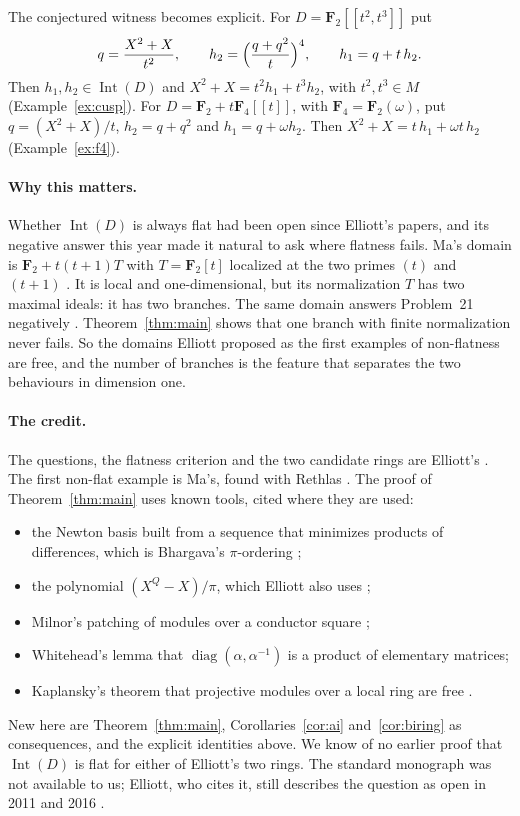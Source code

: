 \documentclass[11pt,a4paper]{article}
\theoremstyle{plain}
\theoremstyle{remark}
\newcommand{\F}{\mathbf F}
\newcommand{\Int}{\operatorname{Int}}
\begin{document}
The conjectured witness becomes explicit. For $D=\F_2[[t^2,t^3]]$ put
\[
 q=\frac{X^2+X}{t^2},\qquad h_2=\Bigl(\frac{q+q^2}{t}\Bigr)^4,\qquad h_1=q+t\,h_2 .
\]
Then $h_1,h_2\in\Int(D)$ and $X^2+X=t^2h_1+t^3h_2$, with $t^2,t^3\in M$ (Example~\ref{ex:cusp}). For
$D=\F_2+t\F_4[[t]]$, with $\F_4=\F_2(\omega)$, put $q=(X^2+X)/t$, $h_2=q+q^2$ and $h_1=q+\omega h_2$. Then
$X^2+X=t\,h_1+\omega t\,h_2$ (Example~\ref{ex:f4}).

\paragraph{Why this matters.}
Whether $\Int(D)$ is always flat had been open since Elliott's papers, and its negative answer this year
\cite{Ma} made it natural to ask where flatness fails. Ma's domain is $\F_2+t(t+1)T$ with $T=\F_2[t]$ localized at
the two primes $(t)$ and $(t+1)$ \cite[\S3]{Ma}. It is local and one-dimensional, but its normalization $T$ has two
maximal ideals: it has two branches. The same domain answers Problem~21 negatively \cite[Theorem~3.4]{JLSWXY}.
Theorem~\ref{thm:main} shows that one branch with finite normalization never fails. So the domains Elliott proposed
as the first examples of non-flatness are free, and the number of branches is the feature that separates the two
behaviours in dimension one.

\paragraph{The credit.}
The questions, the flatness criterion and the two candidate rings are Elliott's \cite{E11a,E11b,CFFG}. The first
non-flat example is Ma's, found with Rethlas \cite{Ma,Rethlas}. The proof of Theorem~\ref{thm:main} uses known tools,
cited where they are used:
\begin{itemize}
\item the Newton basis built from a sequence that minimizes products of differences, which is Bhargava's
$\pi$-ordering \cite{Bha};
\item the polynomial $(X^Q-X)/\pi$, which Elliott also uses \cite[Proposition~5.4, p.~16]{E11b};
\item Milnor's patching of modules over a conductor square \cite[\S2]{Mil};
\item Whitehead's lemma that $\operatorname{diag}(\alpha,\alpha^{-1})$ is a product of elementary matrices;
\item Kaplansky's theorem that projective modules over a local ring are free \cite{Kap}.
\end{itemize}
New here are Theorem~\ref{thm:main}, Corollaries~\ref{cor:ai} and~\ref{cor:biring} as consequences, and the explicit
identities above. We know of no earlier proof that $\Int(D)$ is flat for either of Elliott's two rings. The
standard monograph \cite{CC} was not available to us; Elliott, who cites it, still describes the question as open in
2011 and 2016 \cite{E11b,E16b}.
\end{document}
